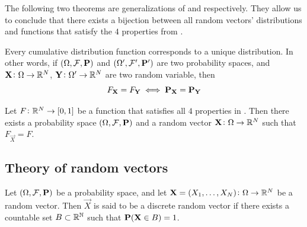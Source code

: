 \documentclass[11pt,a4paper]{article}
\begin{document}
\begin{remark}
  The following two theorems are generalizations of
   and 
  respectively.
  They allow us to conclude that there exists a bijection between all random
  vectors' distributions and
  functions that satisfy the $4$ properties from
  .
\end{remark}
\begin{theorem}
  Every cumulative distribution function corresponds to a unique distribution.
  In other words,
  if $(\Omega, \mathcal F, \mathbf{P})$ and $(\Omega', \mathcal F', \mathbf{P}')$
  are two probability spaces, and $\boldsymbol{\mathbf{X}} \colon \Omega \to \mathbb{R}^N$,
  $\boldsymbol{\mathbf{Y}} \colon \Omega' \to \mathbb{R}^N$ are two random variable, then
  \[
    F_{\boldsymbol{\mathbf{X}}} = F_{\boldsymbol{\mathbf{Y}}} \iff 
    \mathbf{P}_{\boldsymbol{\mathbf{X}}} = \mathbf{P}_{\boldsymbol{\mathbf{Y}}}
  \]
\end{theorem}
\begin{theorem}
  Let $F \colon \mathbb{R}^N \to [0,1]$ be a function that satisfies all $4$
  properties in .
  Then there exists a probability space 
  $(\Omega, \mathcal F, \mathbf{P})$ and a random vector
  $\boldsymbol{\mathbf{X}} \colon \Omega \to \mathbb{R}^N$ such that $F_{\vec{X}} = F$.
\end{theorem}

\subsection{Theory of random vectors}

\begin{definition}
  Let $(\Omega, \mathcal F, \mathbf{P})$ be a probability space, 
  and let $\boldsymbol{\mathbf{X}} = (X_1,\dots,X_N) \colon \Omega \to \mathbb{R}^N$ be a random vector.
  Then $\vec{X}$ is said to be a discrete random vector if there
  exists a countable set $B \subset \mathbb{R}^{\mathbb{N}}$ such that
  $\mathbf{P}(\boldsymbol{\mathbf{X}} \in B) = 1$.
\end{definition}
\end{document}

